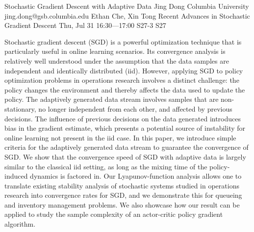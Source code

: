\begin{talk}
  {Stochastic Gradient Descent with Adaptive Data}%
  {Jing Dong}%
  {Columbia University}%
  {jing.dong@gsb.columbia.edu}%
  {Ethan Che, Xin Tong}%
  {Recent Advances in Stochastic Gradient Descent}%
  {Thu, Jul 31 16:30---17:00}%
  {S27-3}%
  {S27}%
    
                
Stochastic gradient descent (SGD) is a powerful optimization technique that is particularly useful in online learning scenarios. Its convergence analysis is relatively well understood under the assumption that the data samples are independent and identically distributed (iid). However, applying SGD to policy optimization
problems in operations research involves a distinct challenge: the policy changes the environment and thereby affects the data used to update the policy. The adaptively generated data stream involves samples that are non-stationary, no longer independent from each other, and affected by previous decisions. The influence of previous decisions on the data generated introduces bias in the gradient estimate, which presents a potential source of instability for online learning not present in the iid case. In this paper, we introduce simple criteria for the adaptively generated data stream to guarantee the convergence of SGD. We show that the convergence
speed of SGD with adaptive data is largely similar to the classical iid setting, as long as the mixing time of the policy-induced dynamics is factored in. Our Lyapunov-function analysis allows one to translate existing stability analysis of stochastic systems studied in operations research into convergence rates for SGD, and
we demonstrate this for queueing and inventory management problems. We also showcase how our result can be applied to study the sample complexity of an actor-critic policy gradient algorithm.   


\medskip


\end{talk}

